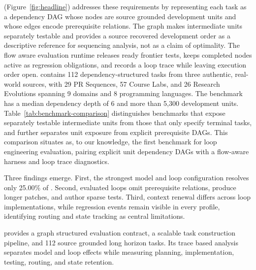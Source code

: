  \lhb{} (Figure~\ref{fig:headline}) addresses these requirements by representing each task as a dependency DAG whose nodes are source grounded development units and whose edges encode prerequisite relations. The graph makes intermediate units separately testable and provides a source recovered development order as a descriptive reference for sequencing analysis, not as a claim of optimality. The flow aware evaluation runtime releases ready frontier tests, keeps completed nodes active as regression obligations, and records a loop trace while leaving execution order open.
\lhb{} contains 112 dependency-structured tasks from three authentic, real-world sources, with 29 PR Sequences, 57 Course Labs, and 26 Research Evolutions spanning 9 domains and 8 programming languages. The benchmark has a median dependency depth of 6 and more than 5{,}300 development units. Table~\ref{tab:benchmark-comparison} distinguishes benchmarks that expose separately testable intermediate units from those that only specify terminal tasks, and further separates unit exposure from explicit prerequisite DAGs. This comparison situates \lhb{} as, to our knowledge, the first benchmark for loop engineering evaluation, pairing explicit unit dependency DAGs with a flow-aware harness and loop trace diagnostics.


 Three findings emerge. First, the strongest model and loop configuration resolves only 25.00\% of \lhb{}. Second, evaluated loops omit prerequisite relations, produce longer patches, and author sparse tests. Third, context renewal differs across loop implementations, while regression events remain visible in every profile, identifying routing and state tracking as central limitations.

 \lhb{} provides a graph structured evaluation contract, a scalable task construction pipeline, and 112 source grounded long horizon tasks. Its trace based analysis separates model and loop effects while measuring planning, implementation, testing, routing, and state retention.
